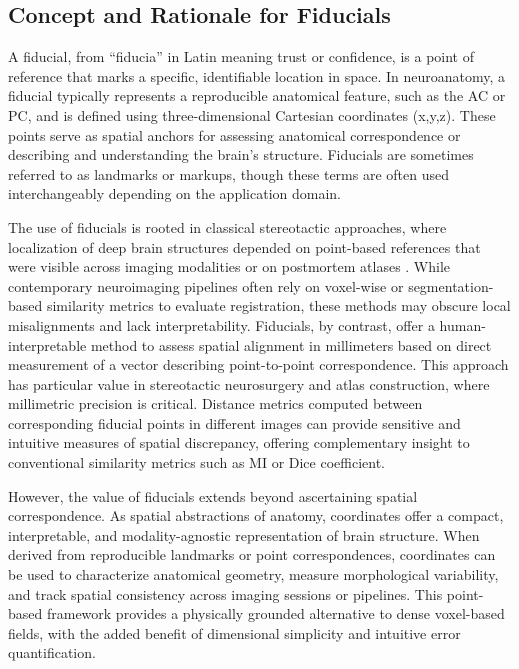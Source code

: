\subsection{Concept and Rationale for Fiducials}
A fiducial, from “fiducia” in Latin meaning trust or confidence, is a point of reference that marks a specific, identifiable location in space. In neuroanatomy, a fiducial typically represents a reproducible anatomical feature, such as the AC or PC, and is defined using three-dimensional Cartesian coordinates (x,y,z). These points serve as spatial anchors for assessing anatomical correspondence or describing and understanding the brain's structure. Fiducials are sometimes referred to as landmarks or markups, though these terms are often used interchangeably depending on the application domain.

The use of fiducials is rooted in classical stereotactic approaches, where localization of deep brain structures depended on point-based references that were visible across imaging modalities or on postmortem atlases \cite{Schaltenbrand1977-ge, Talalrach1957-bs}. While contemporary neuroimaging pipelines often rely on voxel-wise or segmentation-based similarity metrics to evaluate registration, these methods may obscure local misalignments and lack interpretability. Fiducials, by contrast, offer a human-interpretable method to assess spatial alignment in millimeters based on direct measurement of a vector describing point-to-point correspondence. This approach has particular value in stereotactic neurosurgery and atlas construction, where millimetric precision is critical. Distance metrics computed between corresponding fiducial points in different images can provide sensitive and intuitive measures of spatial discrepancy, offering complementary insight to conventional similarity metrics such as MI or Dice coefficient.

However, the value of fiducials extends beyond ascertaining spatial correspondence. As spatial abstractions of anatomy, coordinates offer a compact, interpretable, and modality-agnostic representation of brain structure. When derived from reproducible landmarks or point correspondences, coordinates can be used to characterize anatomical geometry, measure morphological variability, and track spatial consistency across imaging sessions or pipelines. This point-based framework provides a physically grounded alternative to dense voxel-based fields, with the added benefit of dimensional simplicity and intuitive error quantification.

